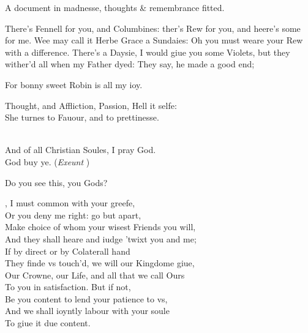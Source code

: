 \documentclass[a5paper,DIV=calc,11pt]{scrbook}
\begin{document}
\begin{drama*}
    \laerspeaks A document in madnesse, thoughts \& remembrance fitted.
    
    \ophespeaks There's Fennell for you, and Columbines: ther's Rew for you, and heere's some for me. Wee may call it Herbe Grace a Sundaies: Oh you must weare your Rew with a difference. There's a Daysie, I would giue you some Violets, but they wither'd all when my Father dyed: They say, he made a good end;\\
    \hspace{2em}\parbox{20em}{For bonny sweet Robin is all my ioy.}
    
    \laerspeaks Thought, and Affliction, Passion, Hell it selfe:\\
    She turnes to Fauour, and to prettinesse.
    
    \ophespeaks \hspace{4em}{And will he not come againe,\\
    And will he not come againe:\\
    No, no, he is dead, go to thy Death-bed,\\
    He neuer wil come againe.\\
    His Beard as white as Snow,\\
    All Flaxen was his Pole:\\
    He is gone, he is gone, and we cast away mone,\\
    Gramercy on his Soule.}\\
    And of all Christian Soules, I pray God.\\
    God buy ye. \hfill(\textit{Exeunt \ophe})
    
    \laerspeaks Do you see this, you Gods?
    
    \kingspeaks \laer, I must common with your greefe,\\
    Or you deny me right: go but apart,\\
    Make choice of whom your wisest Friends you will,\\
    And they shall heare and iudge 'twixt you and me;\\
    If by direct or by Colaterall hand\\
    They finde vs touch'd, we will our Kingdome giue,\\
    Our Crowne, our Life, and all that we call Ours\\
    To you in satisfaction. But if not,\\
    Be you content to lend your patience to vs,\\
    And we shall ioyntly labour with your soule\\
    To giue it due content.
    

\end{drama*}
\end{document}
